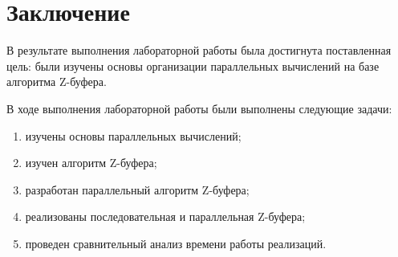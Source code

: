 \chapter*{Заключение}

В результате выполнения лабораторной работы была достигнута поставленная цель: были изучены основы организации параллельных вычислений на базе алгоритма Z-буфера.

В ходе выполнения лабораторной работы были выполнены следующие задачи: 
\begin{enumerate}[label={\arabic*)}]
	\item изучены основы параллельных вычислений;
	\item изучен алгоритм Z-буфера;
	\item разработан параллельный алгоритм Z-буфера;
	\item реализованы последовательная и параллельная Z-буфера;
	\item проведен сравнительный анализ времени работы реализаций.
\end{enumerate}

